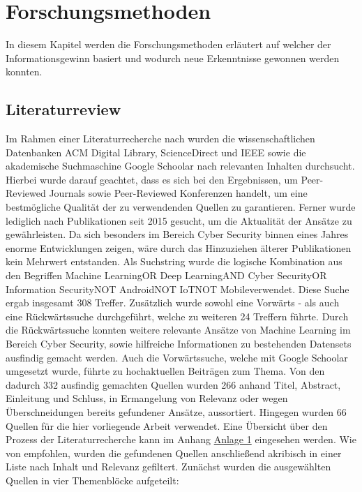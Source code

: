 \documentclass[
    12pt, %
    DIV10,
    ngerman, %
    a4paper, %
    oneside, %
    titlepage, %
    parskip=half, %
    headings=normal, %
    listof=totoc, %
    bibliography=totoc, %
    index=totoc, %
    captions=tableheading, %
    final %
]{scrreprt}
\begin{document}
\chapter{Forschungsmethoden}
In diesem Kapitel werden die Forschungsmethoden erläutert auf welcher der Informationsgewinn basiert und wodurch neue Erkenntnisse gewonnen werden konnten.
\section{Literaturreview}
\label{sec:lr}
Im Rahmen einer Literaturrecherche nach \citeauthor{Webster2002} wurden die wissenschaftlichen Datenbanken ACM Digital Library, ScienceDirect und IEEE sowie die akademische Suchmaschine Google Schoolar nach relevanten Inhalten durchsucht. Hierbei wurde darauf geachtet, dass es sich bei den Ergebnissen, um Peer-Reviewed Journals sowie Peer-Reviewed Konferenzen handelt, um eine bestmögliche Qualität der zu verwendenden Quellen zu garantieren. Ferner wurde lediglich nach Publikationen seit 2015 gesucht, um die Aktualität der Ansätze zu gewährleisten. Da sich besonders im Bereich Cyber Security binnen eines Jahres enorme Entwicklungen zeigen, wäre durch das Hinzuziehen älterer Publikationen kein Mehrwert entstanden. Als Suchstring wurde die logische Kombination aus den Begriffen \glqq Machine Learning\grqq OR \glqq Deep Learning\grqq AND \glqq Cyber Security\grqq OR \glqq Information Security\grqq NOT \glqq Android\grqq NOT \glqq IoT\grqq NOT \glqq Mobile\grqq verwendet. Diese Suche ergab insgesamt 308 Treffer. Zusätzlich wurde sowohl eine Vorwärts - als auch eine Rückwärtssuche durchgeführt, welche zu weiteren 24 Treffern führte. Durch die Rückwärtssuche konnten weitere relevante Ansätze von Machine Learning im Bereich Cyber Security, sowie hilfreiche Informationen zu bestehenden Datensets ausfindig gemacht werden. Auch die Vorwärtssuche, welche mit Google Schoolar umgesetzt wurde, führte zu hochaktuellen Beiträgen zum Thema. Von den dadurch 332 ausfindig gemachten Quellen wurden 266 anhand Titel, Abstract, Einleitung und Schluss, in Ermangelung von Relevanz oder wegen Überschneidungen bereits gefundener Ansätze, aussortiert. Hingegen wurden 66 Quellen für die hier vorliegende Arbeit verwendet. Eine Übersicht über den Prozess der Literaturrecherche kann im Anhang \hyperref[rm]{Anlage 1} eingesehen werden. Wie von \citeauthor{Webster2002} empfohlen, wurden die gefundenen Quellen anschließend akribisch in einer Liste nach Inhalt und Relevanz gefiltert. Zunächst wurden die ausgewählten Quellen in vier Themenblöcke aufgeteilt:
\end{document}
